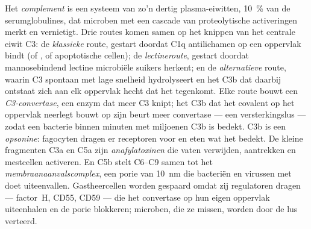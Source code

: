 \begin{definition}[Complement]\label{def:b3:innate-immunity:complement}
Het \emph{complement} is een systeem van zo'n dertig plasma-eiwitten,
\qty{10}{\%} van de serumglobulines, dat microben met een cascade van
proteolytische activeringen merkt en vernietigt. Drie routes komen
samen op het knippen van het centrale eiwit C3: de \emph{klassieke}
route, gestart doordat C1q antilichamen op een oppervlak bindt (of
, of apoptotische cellen); de \emph{lectineroute},
gestart doordat mannosebindend lectine microbiële suikers herkent; en
de \emph{alternatieve} route, waarin C3 spontaan met lage snelheid
hydrolyseert en het C3b dat daarbij ontstaat zich aan elk oppervlak
hecht dat het tegenkomt. Elke route bouwt een \emph{C3-convertase}, een
enzym dat meer C3 knipt; het C3b dat het covalent op het oppervlak
neerlegt bouwt op zijn beurt meer convertase --- een versterkingslus
--- zodat een bacterie binnen minuten met miljoenen C3b is bedekt. C3b
is een \emph{opsonine}: fagocyten dragen er receptoren voor en eten wat
het bedekt. De kleine fragmenten C3a en C5a zijn
\emph{anafylatoxinen} die vaten verwijden,  aantrekken en
mestcellen activeren. En C5b stelt C6--C9 samen tot het
\emph{membraanaanvalscomplex}, een porie van \qty{10}{nm} die
 bacteriën en virussen met  doet uiteenvallen.
Gastheercellen worden gespaard omdat zij regulatoren dragen ---
factor~H, CD55, CD59 --- die het convertase op hun eigen oppervlak
uiteenhalen en de porie blokkeren; microben, die ze missen, worden door
de lus verteerd.
\end{definition}

